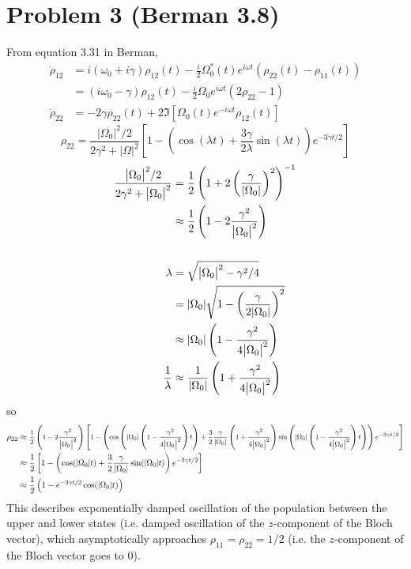 \documentclass[12pt]{article}
\newcommand{\magsq}[1]{\big|#1\big|^2}
\begin{document}
\section*{Problem 3 (Berman 3.8)}
From equation 3.31 in Berman,
\begin{align*}
    \dot{\rho}_{12} &= i(\omega_0 + i\gamma)\rho_{12}(t) - \frac{i}{2}\Omega_0^*(t)e^{i\omega t}\left(\rho_{22}(t)-\rho_{11}(t)\right) \\
    &= (i\omega_0 - \gamma)\rho_{12}(t) - \frac{i}{2}\Omega_0e^{i\omega t}(2\rho_{22} - 1) \\
    \dot{\rho}_{22} &= -2\gamma\rho_{22}(t) + 2\Im[\Omega_0(t)e^{-i\omega t}\rho_{12}(t)]
\end{align*}
\[ \rho_{22} = \frac{\magsq{\Omega_0}/2}{2\gamma^2 + \magsq{\Omega}}\left[1 - \left(\cos(\lambda t) + \frac{3\gamma}{2\lambda}\sin(\lambda t)\right)e^{-3\gamma t/2}\right] \]
\begin{align*}
    \frac{\magsq{\Omega_0}/2}{2\gamma^2 + \magsq{\Omega_0}} &= \frac{1}{2}\left(1 + 2\left(\frac{\gamma}{\abs{\Omega_0}}\right)^2\right)^{-1} \\
    &\approx \frac{1}{2}\left(1 - 2\frac{\gamma^2}{\magsq{\Omega_0}}\right) \\
    \\
    \lambda &= \sqrt{\magsq{\Omega_0} - \gamma^2/4} \\
    &= \abs{\Omega_0}\sqrt{1 - \left(\frac{\gamma}{2\abs{\Omega_0}}\right)^2}\\
    &\approx \abs{\Omega_0}\left(1 - \frac{\gamma^2}{4\magsq{\Omega_0}}\right) \\
    \frac{1}{\lambda} &\approx \frac{1}{\abs{\Omega_0}}\left(1 + \frac{\gamma^2}{4\magsq{\Omega_0}}\right)
\end{align*}
so
\begin{align*}
    \rho_{22} &\approx \medmath{\frac{1}{2}\left(1 - 2\frac{\gamma^2}{\magsq{\Omega_0}}\right)\left[1 - \left(\cos\left(\abs{\Omega_0}\left(1 - \frac{\gamma^2}{4\magsq{\Omega_0}}\right)t\right)+\frac{3}{2}\frac{\gamma}{\abs{\Omega_0}}\left(1 + \frac{\gamma^2}{4\magsq{\Omega_0}}\right)\sin\left(\abs{\Omega_0}\left(1 - \frac{\gamma^2}{4\magsq{\Omega_0}}\right)t\right)\right)e^{-3\gamma t/2}\right]} \\
    &\approx \frac{1}{2}\left[1 - \left(\cos(\abs{\Omega_0}t) + \frac{3}{2}\frac{\gamma}{\abs{\Omega_0}}\sin(\abs{\Omega_0}t)\right)e^{-3\gamma t/2}\right] \\
    &\approx \frac{1}{2}\left(1 - e^{-3\gamma t/2}\cos(\abs{\Omega_0}t)\right)
\end{align*}
This describes exponentially damped oscillation of the population between the upper and lower states (i.e. damped oscillation of the $z$-component of the Bloch vector), which asymptotically approaches $\rho_{11} = \rho_{22} = 1/2$ (i.e. the $z$-component of the Bloch vector goes to 0).
\end{document}
